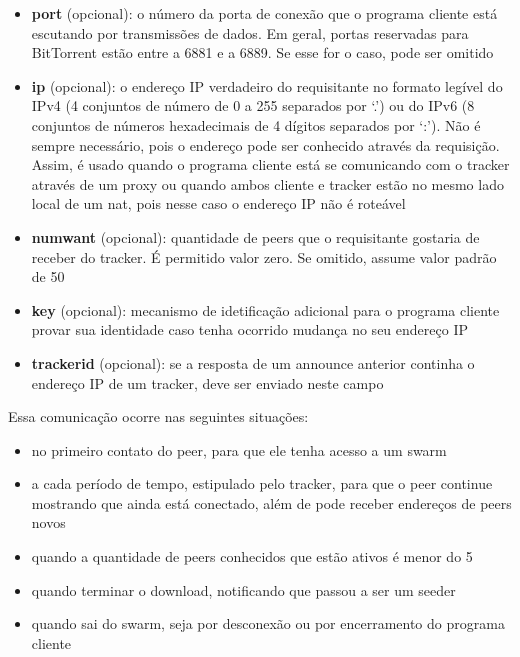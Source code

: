 \begin{itemize}
    \item \textbf{port} (opcional): o número da porta de conexão que o programa cliente
    está escutando por transmissões de dados. Em geral, portas reservadas para
    BitTorrent estão entre a 6881 e a 6889. Se esse for o caso, pode ser omitido

    \item \textbf{ip} (opcional): o endereço IP verdadeiro do requisitante no formato
    legível do IPv4 (4 conjuntos de número de 0 a 255 separados por `.') ou do IPv6 (8
    conjuntos de números hexadecimais de 4 dígitos separados por `:'). Não é sempre
    necessário, pois o endereço pode ser conhecido através da requisição. Assim, é usado
    quando o programa cliente está se comunicando com o \gls*{tracker} através de um
    \gls{proxy} ou quando ambos cliente e \gls*{tracker} estão no mesmo lado local de um
    \gls{nat}, pois nesse caso o endereço IP não é roteável

    \item \textbf{numwant} (opcional): quantidade de \glspl*{peer} que o requisitante
    gostaria de receber do \gls*{tracker}. É permitido valor zero. Se omitido, assume
    valor padrão de 50

    \item \textbf{key} (opcional): mecanismo de idetificação adicional para o programa
    cliente provar sua identidade caso tenha ocorrido mudança no seu endereço IP

    \item \textbf{trackerid} (opcional): se a resposta de um \gls*{announce} anterior
    continha o endereço IP de um \gls*{tracker}, deve ser enviado neste campo
\end{itemize}

\newpage
{}

Essa comunicação ocorre nas seguintes situações:

\begin{itemize}
    \item no primeiro contato do \gls*{peer}, para que ele tenha acesso a um
        \gls*{swarm}

    \item a cada período de tempo, estipulado pelo tracker, para que o \gls*{peer}
        continue mostrando que ainda está conectado, além de pode receber endereços de
        \glspl*{peer} novos

    \item quando a quantidade de \glspl*{peer} conhecidos que estão ativos é menor do 5

    \item quando terminar o download, notificando que passou a ser um \gls*{seeder}

    \item quando sai do \gls*{swarm}, seja por desconexão ou por encerramento do
        programa cliente
\end{itemize}

